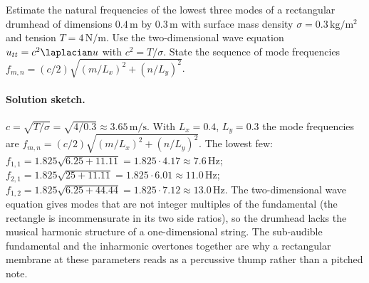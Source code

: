 \begin{exercise}
Estimate the natural frequencies of the lowest three modes of a
rectangular drumhead of dimensions $0.4\,\si{\meter}$ by $0.3\,
\si{\meter}$ with surface mass density $\sigma = 0.3\,\si
{\kilogram\per\meter\squared}$ and tension $T = 4\,\si{\newton
\per\meter}$. Use the two-dimensional wave equation $u_{tt} =
c^{2}\laplacian u$ with $c^{2} = T/\sigma$. State the sequence of
mode frequencies $f_{m,n} = (c/2)\sqrt{(m/L_{x})^{2} +
(n/L_{y})^{2}}$.

\paragraph{Solution sketch.}
$c = \sqrt{T/\sigma} = \sqrt{4/0.3} \approx 3.65\,\si{\meter\per
\second}$. With $L_{x} = 0.4$, $L_{y} = 0.3$ the mode frequencies
are $f_{m,n} = (c/2)\sqrt{(m/L_{x})^{2} + (n/L_{y})^{2}}$. The
lowest few:
$f_{1,1} = 1.825 \sqrt{6.25 + 11.11} = 1.825 \cdot 4.17 \approx
7.6\,\si{\hertz}$;
$f_{2,1} = 1.825 \sqrt{25 + 11.11} = 1.825 \cdot 6.01 \approx
11.0\,\si{\hertz}$;
$f_{1,2} = 1.825 \sqrt{6.25 + 44.44} = 1.825 \cdot 7.12 \approx
13.0\,\si{\hertz}$.
The two-dimensional wave equation gives modes that are not
integer multiples of the fundamental (the rectangle is
incommensurate in its two side ratios), so the drumhead lacks the
musical harmonic structure of a one-dimensional string. The
sub-audible fundamental and the inharmonic overtones together
are why a rectangular membrane at these parameters reads as a
percussive thump rather than a pitched note.
\end{exercise}

